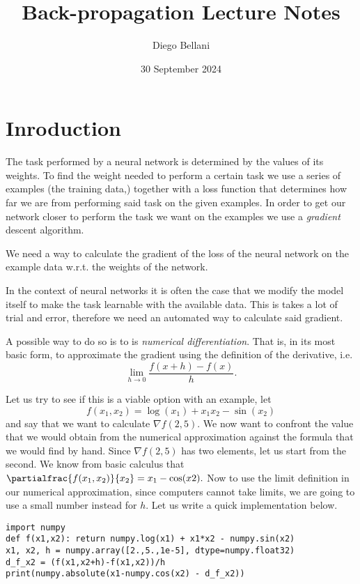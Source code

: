 \documentclass{article}
\title{Back-propagation Lecture Notes}
\author{Diego Bellani}
\date{30 September 2024}
\begin{document}
\maketitle

\section{Inroduction}

The task performed by a neural network is determined by the values of its weights.
To find the weight needed to perform a certain task we use a series of examples
(the training data,) together with a loss function that determines how far we are
from performing said task on the given examples. In order to get our network
closer to perform the task we want on the examples we use a \emph{gradient}
descent algorithm.

We need a way to calculate the gradient of the loss of the neural network on
the example data w.r.t. the weights of the network.

In the context of neural networks it is often the case that we modify the model
itself to make the task learnable with the available data. This is takes a lot of
trial and error, therefore we need an automated way to calculate said gradient.

A possible way to do so is to is \emph{numerical differentiation}. That is, in
its most basic form, to approximate the gradient using the definition of the
derivative, i.e. \[\lim_{h \to 0} \frac{f(x+h)-f(x)} h.\]

Let us try to see if this is a viable option with an example, let
\begin{equation}
f(x_1, x_2) = \log(x_1)+x_1x_2-\sin(x_2) \label{eqn:example}
\end{equation}
and say that we want to calculate \(\nabla{f(2,5)}.\) We now want to confront
the value that we would obtain from the numerical approximation against the
formula that we would find by hand. Since \(\nabla{f(2,5)}\) has two elements,
let us start from the second. We know from basic calculus that
\(\partialfrac{f(x_1,x_2)}{x_2} = x_1-\cos(x2).\) Now to use the limit
definition in our numerical approximation, since computers cannot take limits,
we are going to use a small number instead for \(h.\) Let us write a quick
implementation below.

\begin{verbatim}
import numpy
def f(x1,x2): return numpy.log(x1) + x1*x2 - numpy.sin(x2)
x1, x2, h = numpy.array([2.,5.,1e-5], dtype=numpy.float32)
d_f_x2 = (f(x1,x2+h)-f(x1,x2))/h
print(numpy.absolute(x1-numpy.cos(x2) - d_f_x2))
\end{verbatim}
\end{document}
